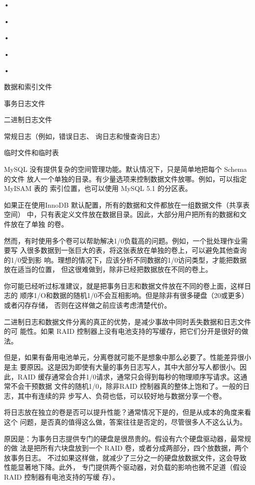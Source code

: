 •

•

•

•

•

数据和索引文件

事务日志文件

二进制日志文件

常规日志（例如，错误日志、 询日志和慢查询日志）

临时文件和临时表

MySQL 没有提供复杂的空间管理功能。默认情况下，只是简单地把每个 Schema 的文件
放人一个单独的目录。有少量选项来控制数据文件放哪。例如，可以指定 MyISAM 表的
索引位置，也可以使用 MySQL 5.1 的分区表。

如果正在使用InnoDB 默认配置，所有的数据和文件都放在一组数据文件（共享表空间）
中，只有表定义文件放在数据目录。因此，大部分用户把所有的数据和文件放在了单独
的卷。

然而，有时使用多个卷可以帮助解决1/0负载高的问题。例如，一个批处理作业需要写
入很多数据到一张巨大的表，将这张表放在单独的卷上，可以避免其他查询的1/0受到影
响。理想的情况下，应该分析不同数据的1/0访问类型，才能把数据放在适当的位置，
但这很难做到，除非已经把数据放在不同的卷上。

你可能已经听过标准建议，就是把事务日志和数据文件放在不同的卷上面，这样日志的
顺序1/O和数据的随机1/0不会互相影响。但是除非有很多硬盘（20或更多）或者闪存存储，
否则在这样做之前应该考虑清楚代价。

二进制日志和数据文件分离的真正的优势，是减少事故中同时丢失数据和日志文件的可
能性。如果 RAID 控制器上没有电池支持的写缓存，把它们分开是很好的做法。

但是，如果有备用电池单元，分离卷就可能不是想象中那么必要了。性能差异很小是主
要原因。这是因为即使有大量的事务日志写人，其中大部分写人都很小。因此，RAID
缓存通常会合并1/0请求，通常只会得到每秒的物理顺序写请求。这通常不会干预数据
文件的随机1/0，除非RAID 控制器真的整体上饱和了。一般的日志，其中有连续的异
步写人、负荷也低，可以较好地与数据分享一个卷。

将日志放在独立的卷是否可以提升性能？通常情况下是的，但是从成本的角度来看这个
问题，是否真的值得这么做，答案往往是否定的，尽管很多人不这么认为。

原因是：为事务日志提供专门的硬盘是很昂贵的。假设有六个硬盘驱动器，最常规的做
法是把所有六块盘放到一个 RAID 卷，或者分成两部分，四个放数据，两个放事务日志。
不过如果这样做，就减少了三分之一的硬盘放数据文件，这会导致性能显著地下降。此外，
专门提供两个驱动器，对负载的影响也微不足道（假设 RAID 控制器有电池支持的写缓
存）。

